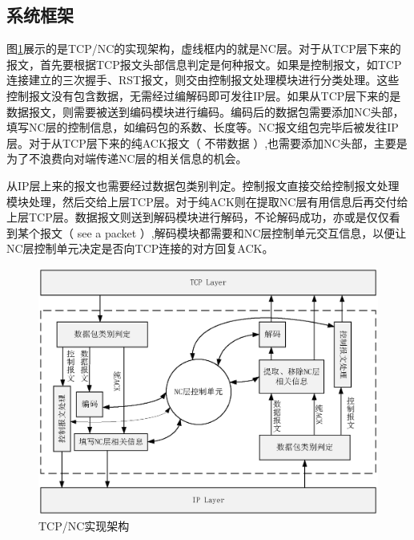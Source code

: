 \subsection{系统框架}
图\ref{JIAGOU_EPS}展示的是TCP/NC的实现架构，虚线框内的就是NC层。对于从TCP层下来的报文，首先要根据TCP报文头部信息判定是何种报文。如果是控制报文，如TCP连接建立的三次握手、RST报文，则交由控制报文处理模块进行分类处理。这些控制报文没有包含数据，无需经过编解码即可发往IP层。如果从TCP层下来的是数据报文，则需要被送到编码模块进行编码。编码后的数据包需要添加NC头部，填写NC层的控制信息，如编码包的系数、长度等。NC报文组包完毕后被发往IP层。对于从TCP层下来的纯ACK报文（ 不带数据 ）,也需要添加NC头部，主要是为了不浪费向对端传递NC层的相关信息的机会。
\par
从IP层上来的报文也需要经过数据包类别判定。控制报文直接交给控制报文处理模块处理，然后交给上层TCP层。对于纯ACK则在提取NC层有用信息后再交付给上层TCP层。数据报文则送到解码模块进行解码，不论解码成功，亦或是仅仅看到某个报文（ see a packet ）,解码模块都需要和NC层控制单元交互信息，以便让NC层控制单元决定是否向TCP连接的对方回复ACK。
\begin{figure}[htbp]
	\centering
	\includegraphics[width=5in]{figures/jiagou.eps}
	\caption{TCP/NC实现架构}
	\label{JIAGOU_EPS}
\end{figure}

